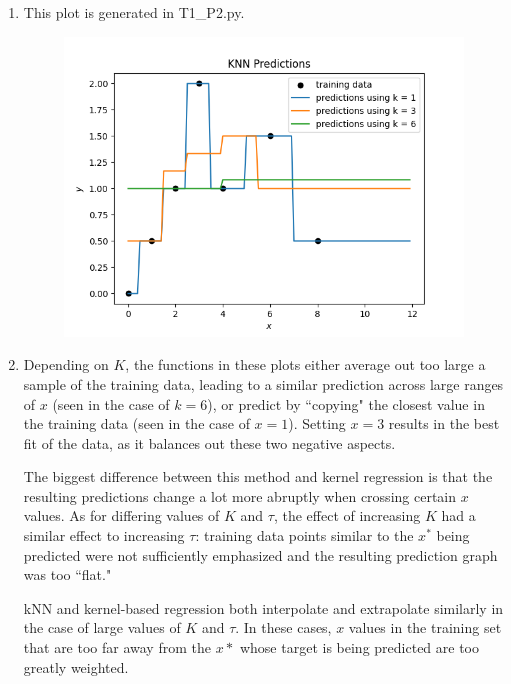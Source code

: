 \documentclass[submit]{harvardml}
\begin{document}
\begin{enumerate}

\item This plot is generated in T1\_P2.py.

\begin{figure}[h]
\includegraphics[scale=0.8]{P2}
\centering
\end{figure}

\item 

Depending on $K$, the functions in these plots either average out too large a sample of the 
training data, leading to a similar prediction across large ranges of $x$ (seen in the case of $k=6$), 
or predict by ``copying" the closest value in the training data (seen in the case of $x=1$). Setting
$x=3$ results in the best fit of the data, as it balances out these two negative aspects.

The biggest difference between this method and kernel regression is that the resulting predictions
change a lot more abruptly when crossing certain $x$ values. As for differing values of $K$ and $\tau$,
the effect of increasing $K$ had a similar effect to increasing $\tau$: training data points similar
to the $x^*$ being predicted were not sufficiently emphasized and the resulting prediction graph
was too ``flat." 

kNN and kernel-based regression both interpolate and extrapolate similarly in the case of large 
values of $K$ and $\tau$. In these cases, $x$ values in the training set that are too far away 
from the $x*$ whose target is being predicted are too greatly weighted.


\end{enumerate}
\end{document}
